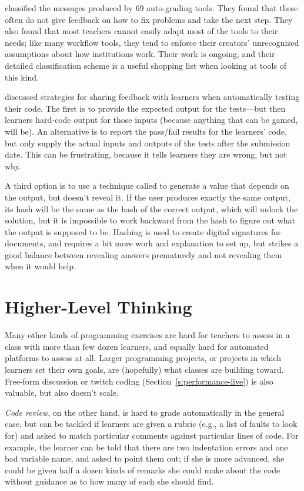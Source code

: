 \cite{Keun2016a,Keun2016b} classified the messages produced by 69
auto-grading tools. They found that these often do not give feedback on
how to fix problems and take the next step. They also found that most
teachers cannot easily adapt most of the tools to their needs; like many
workflow tools, they tend to enforce their creators' unrecognized
assumptions about how institutions work. Their work is ongoing, and
their detailed classification scheme is a useful shopping list when
looking at tools of this kind.

\cite{Srid2016} discussed strategies for sharing feedback with
learners when automatically testing their code. The first is to provide
the expected output for the tests---but then learners hard-code output for
those inputs (because anything that can be gamed, will be). An
alternative is to report the pass/fail results for the learners' code,
but only supply the actual inputs and outputs of the tests after the
submission date. This can be frustrating, because it tells learners they
are wrong, but not why.

A third option is to use a technique called  to
generate a value that depends on the output, but doesn't reveal it. If
the user produces exactly the same output, its hash will be the same
as the hash of the correct output, which will unlock the solution, but
it is impossible to work backward from the hash to figure out what the
output is supposed to be. Hashing is used to create digital signatures
for documents, and requires a bit more work and explanation to set up,
but strikes a good balance between revealing answers prematurely and
not revealing them when it would help.

\section{Higher-Level Thinking}\label{s:exercises-higher}

Many other kinds of programming exercises are hard for teachers to
assess in a class with more than few dozen learners, and equally hard
for automated platforms to assess at all. Larger programming projects,
or projects in which learners set their own goals, are (hopefully) what
classes are building toward. Free-form discussion or twitch coding
(Section~\ref{s:performance-live}) is also valuable, but also doesn't
scale.

\emph{Code review}, on the other hand, is hard to grade automatically in the
general case, but can be tackled if learners are given a rubric (e.g., a
list of faults to look for) and asked to match particular comments
against particular lines of code. For example, the learner can be told
that there are two indentation errors and one bad variable name, and
asked to point them out; if she is more advanced, she could be given
half a dozen kinds of remarks she could make about the code without
guidance as to how many of each she should find.

